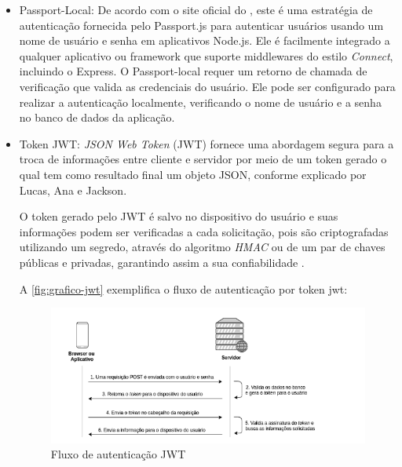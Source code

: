 \begin{itemize}
    \item Passport-Local: De acordo com o site oficial do \cite{passport84}, este é uma estratégia de autenticação fornecida pelo Passport.js para autenticar usuários usando um nome de usuário e senha em aplicativos Node.js. Ele é facilmente integrado a qualquer aplicativo ou framework que suporte middlewares do estilo \textit{Connect}, incluindo o Express. O Passport-local requer um retorno de chamada de verificação que valida as credenciais do usuário. Ele pode ser configurado para realizar a autenticação localmente, verificando o nome de usuário e a senha no banco de dados da aplicação. 
    \item Token JWT: \textit{JSON Web Token} (JWT) fornece uma abordagem segura para a troca de informações entre cliente e servidor por meio de um token gerado o qual tem como resultado final um objeto JSON, conforme explicado por Lucas, Ana e Jackson.
    \begin{citacao}
        O token gerado pelo JWT é salvo
        no dispositivo do usuário e suas informações podem ser verificadas a cada solicitação,
        pois são criptografadas utilizando um segredo, através do algoritmo \textit{HMAC} ou de um par de chaves públicas e privadas, garantindo assim a sua confiabilidade \cite{segurancaeauth}.
    \end{citacao}
    A \autoref{fig:grafico-jwt} exemplifica o fluxo de autenticação por token jwt: 

\begin{figure}
    \caption{\label{fig:grafico-jwt} Fluxo de autenticação JWT}
    \begin{center}
        \includegraphics[scale=0.6]{imagens/jwt.png}
    \end{center}
\end{figure}
    
\end{itemize}

